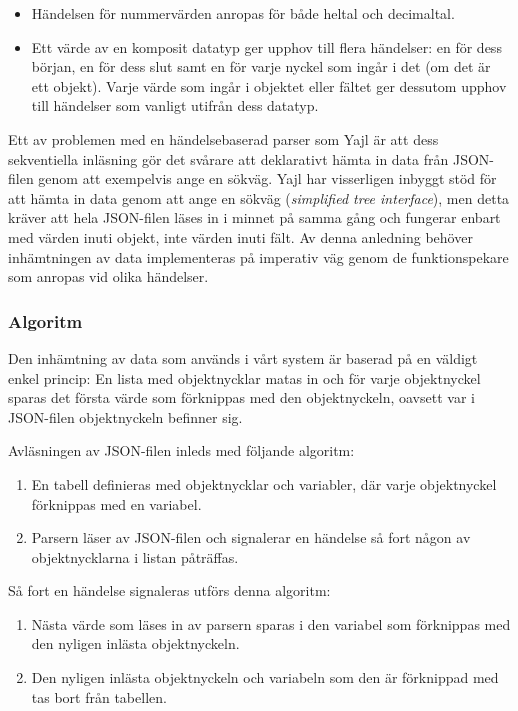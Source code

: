 \documentclass[a4paper,11pt]{article}
\begin{document}
	\begin{itemize}
	\item Händelsen för nummervärden anropas för både heltal och decimaltal.
    	\item Ett värde av en komposit datatyp ger upphov till flera händelser: en för dess början, en för dess slut samt en för varje nyckel som ingår i det (om det är ett objekt). Varje värde som ingår i objektet eller fältet ger dessutom upphov till händelser som vanligt utifrån dess datatyp.
    	\end{itemize}
    	
Ett av problemen med en händelsebaserad parser som Yajl är att dess sekventiella inläsning gör det svårare att deklarativt hämta in data från JSON-filen genom att exempelvis ange en sökväg. Yajl har visserligen inbyggt stöd för att hämta in data genom att ange en sökväg ({\it simplified tree interface}), men detta kräver att hela JSON-filen läses in i minnet på samma gång och fungerar enbart med värden inuti objekt, inte värden inuti fält. Av denna anledning behöver inhämtningen av data implementeras på imperativ väg genom de funktionspekare som anropas vid olika händelser.

\subsubsection{Algoritm}

Den inhämtning av data som används i vårt system är baserad på en väldigt enkel princip: En lista med objektnycklar matas in och för varje objektnyckel sparas det första värde som förknippas med den objektnyckeln, oavsett var i JSON-filen objektnyckeln befinner sig.

Avläsningen av JSON-filen inleds med följande algoritm:

	\begin{enumerate}
    	\item En tabell definieras med objektnycklar och variabler, där varje objektnyckel förknippas med en variabel.
    	\item Parsern läser av JSON-filen och signalerar en händelse så fort någon av objektnycklarna i listan påträffas.
	\end{enumerate}

Så fort en händelse signaleras utförs denna algoritm:
	
	\begin{enumerate}
    	\item Nästa värde som läses in av parsern sparas i den variabel som förknippas med den nyligen inlästa objektnyckeln.
    	\item Den nyligen inlästa objektnyckeln och variabeln som den är förknippad med tas bort från tabellen.
	\end{enumerate}
\end{document}
